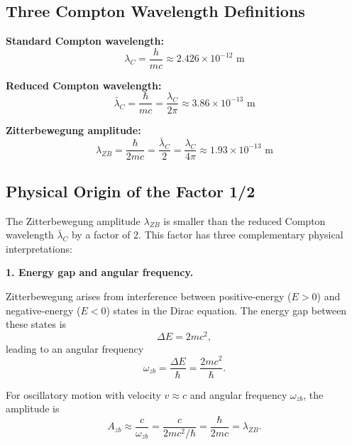 \documentclass[%
 reprint,
 amsmath,amssymb,
 aps,
 prb,
]{revtex4-2}
\numberwithin{equation}{section}
\begin{document}
\subsection{Three Compton Wavelength Definitions}

\noindent\textbf{Standard Compton wavelength:}
\begin{equation}
\lambda_C = \frac{h}{mc} \approx 2.426 \times 10^{-12} \text{ m}
\end{equation}

\noindent\textbf{Reduced Compton wavelength:}
\begin{equation}
\bar{\lambda}_C = \frac{\hbar}{mc} = \frac{\lambda_C}{2\pi} \approx 3.86 \times 10^{-13} \text{ m}
\end{equation}

\noindent\textbf{Zitterbewegung amplitude:}
\begin{equation}
\lambda_{ZB} = \frac{\hbar}{2mc} = \frac{\bar{\lambda}_C}{2} = \frac{\lambda_C}{4\pi} \approx 1.93 \times 10^{-13} \text{ m}
\end{equation}


\subsection{Physical Origin of the Factor 1/2}

The Zitterbewegung amplitude $\lambda_{ZB}$ is smaller than the reduced Compton wavelength $\bar{\lambda}_C$ by a factor of 2. This factor has three complementary physical interpretations:

\medskip
\noindent\textbf{1. Energy gap and angular frequency.}

Zitterbewegung arises from interference between positive-energy ($E > 0$) and negative-energy ($E < 0$) states in the Dirac equation. The energy gap between these states is
\begin{equation}
\Delta E = 2mc^2,
\end{equation}
leading to an angular frequency
\begin{equation}
\omega_{zb} = \frac{\Delta E}{\hbar} = \frac{2mc^2}{\hbar}.
\end{equation}

For oscillatory motion with velocity $v \approx c$ and angular frequency $\omega_{zb}$, the amplitude is
\begin{equation}
A_{zb} \approx \frac{c}{\omega_{zb}} = \frac{c}{2mc^2/\hbar} = \frac{\hbar}{2mc} = \lambda_{ZB}.
\end{equation}
\end{document}
